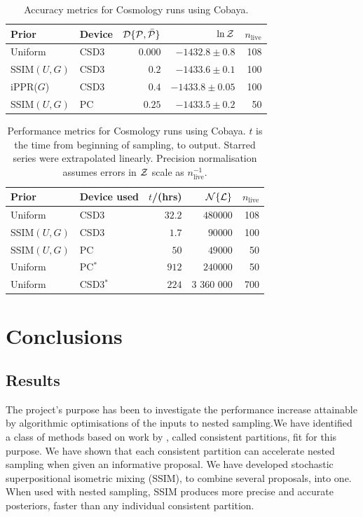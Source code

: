 \documentclass[usenatbib]{mnras}
\begin{document}
\begin{table}
  \centering
  \caption{Accuracy metrics for Cosmology runs using Cobaya.}
  \begin{tabular}{llrrr}
    \textbf{Prior} & \textbf{Device} & ${\cal D}\{ {\cal P}, \bar{\cal P}\}$ & $\ln {\cal Z}$ & $n_\text{live}$\\
    \hline
    Uniform & CSD3 &\( 0.000\) & \(-1432.8 \pm 0.8\) & 108\\
    SSIM\((U, G)\) & CSD3 & \(0.2\) & \(-1433.6 \pm 0.1\) & 100\\
    iPPR(\(G\)) & CSD3 & \(0.4\) & \(-1433.8 \pm 0.05\) & 100\\
    SSIM\((U, G)\) & PC & \(0.25\) & \(-1433.5 \pm 0.2\) & 50
  \end{tabular}
  \label{tab:cosmo-accuracy}
\end{table}

\begin{table}
  \centering
  \caption{Performance metrics for Cosmology runs using Cobaya. $t$ is
    the time from beginning of sampling, to output. Starred series
    were extrapolated linearly. Precision normalisation assumes errors in
    ${\cal Z}$ scale as $n_\text{live}^{-1}$. }
  \begin{tabular}{llrrr}
    \textbf{Prior} & \textbf{Device used} & \textbf{$t$/(hrs)} & \({\cal N}\{ {\cal L}\}\) & $n_\text{live}$\\
    \hline
    Uniform & CSD3 &\( 32.2 \) & \(480 000\) & 108\\
    SSIM\((U, G)\) & CSD3 & \(1.7\) & \(90 000\) & 100\\
    SSIM\((U, G)\) & PC & \(50\) & \(49 000\) & 50\\
    \hline
    Uniform & PC$^{*}$ & \(912\) & \(240 000\) & 50\\
    Uniform & CSD3$^{*}$ &  \(224\) & 3 360 000  & 700
  \end{tabular}
  \label{tab:cosmo-performance}
\end{table}

\section{Conclusions}\label{sec:orgdf2cbd9}

\subsection{Results}\label{sec:orgc48c55d}
The project's purpose has been to investigate the performance increase
attainable by algorithmic optimisations of the inputs to nested
sampling.We have identified a class of methods based on work by
\cite{chen-ferroz-hobson}, called consistent partitions, fit for this
purpose. We have shown that each consistent partition can accelerate
nested sampling when given an informative proposal.  We have developed
stochastic superpositional isometric mixing (SSIM), to combine several
proposals, into one. When used with nested sampling, SSIM produces
more precise and accurate posteriors, faster than any individual
consistent partition.
\end{document}
